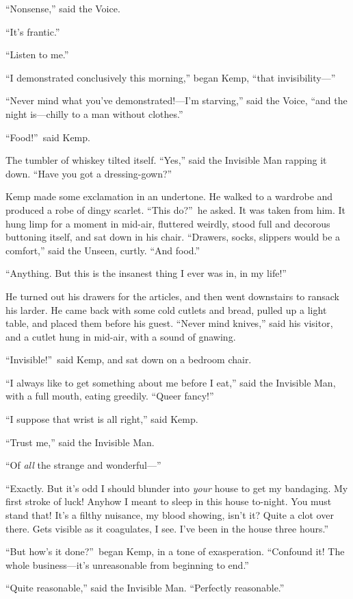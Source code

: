 “Nonsense,” said the Voice.

“It’s frantic.”

“Listen to me.”

“I demonstrated conclusively this morning,” began Kemp, “that invisibility—”

“Never mind what you’ve demonstrated!—I’m starving,” said the Voice, “and the night is—chilly to a man without clothes.”

“Food!”\ said Kemp.

The tumbler of whiskey tilted itself. “Yes,” said the Invisible Man rapping it down. “Have you got a dressing-gown?”

Kemp made some exclamation in an undertone. He walked to a wardrobe and produced a robe of dingy scarlet. “This do?”\ he asked. It was taken from him. It hung limp for a moment in mid-air, fluttered weirdly, stood full and decorous buttoning itself, and sat down in his chair. “Drawers, socks, slippers would be a comfort,” said the Unseen, curtly. “And food.”

“Anything. But this is the insanest thing I ever was in, in my life!”

He turned out his drawers for the articles, and then went downstairs to ransack his larder. He came back with some cold cutlets and bread, pulled up a light table, and placed them before his guest. “Never mind knives,” said his visitor, and a cutlet hung in mid-air, with a sound of gnawing.

“Invisible!”\ said Kemp, and sat down on a bedroom chair.

“I always like to get something about me before I eat,” said the Invisible Man, with a full mouth, eating greedily. “Queer fancy!”

“I suppose that wrist is all right,” said Kemp.

“Trust me,” said the Invisible Man.

“Of \emph{all} the strange and wonderful—”

“Exactly. But it’s odd I should blunder into \emph{your} house to get my bandaging. My first stroke of luck! Anyhow I meant to sleep in this house to-night. You must stand that! It’s a filthy nuisance, my blood showing, isn’t it? Quite a clot over there. Gets visible as it coagulates, I see. I’ve been in the house three hours.”

“But how’s it done?”\ began Kemp, in a tone of exasperation. “Confound it! The whole business—it’s unreasonable from beginning to end.”

“Quite reasonable,” said the Invisible Man. “Perfectly reasonable.”

